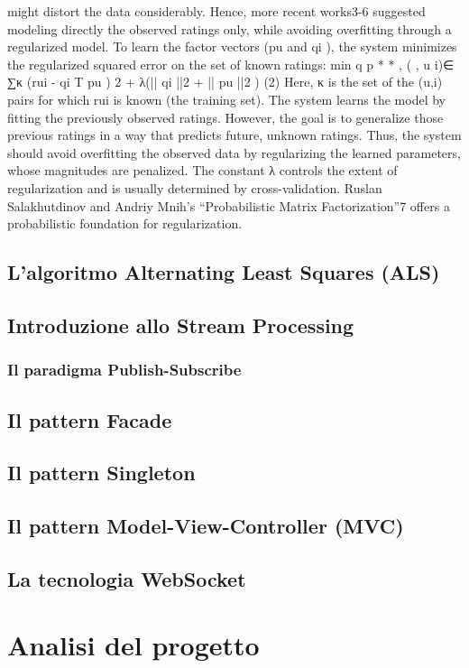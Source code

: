 \documentclass[11pt]{article}
\begin{document}
 might distort the data considerably. Hence, more recent
 works3-6 suggested modeling directly the observed ratings
 only, while avoiding overfitting through a regularized
 model. To learn the factor vectors (pu and qi ), the system minimizes the regularized squared error on the set of
 known ratings:
 min q p * * , ( , u i)∈
 ∑κ
 (rui - qi
 T
 pu
 )
 2
 + λ(|| qi
 ||2
 + || pu
 ||2
 ) (2)
 Here, κ is the set of the (u,i) pairs for which rui is known
 (the training set). The system learns the model by fitting the previously observed ratings. However, the goal is to generalize those previous ratings in a way that predicts future, unknown ratings. Thus, the system should avoid overfitting the observed data by regularizing the learned parameters, whose magnitudes are penalized. The constant λ controls the extent of regularization and is usually determined by cross-validation. Ruslan Salakhutdinov and Andriy Mnih’s
 “Probabilistic Matrix Factorization”7
 offers a probabilistic foundation for regularization.

\subsection{L'algoritmo Alternating Least Squares (ALS)}

\subsection{Introduzione allo Stream Processing}
\subsubsection{Il paradigma Publish-Subscribe}
\subsection{Il pattern Facade}
\subsection{Il pattern Singleton}
\subsection{Il pattern Model-View-Controller (MVC)}
\subsection{La tecnologia WebSocket}

\section{Analisi del progetto}
\end{document}
